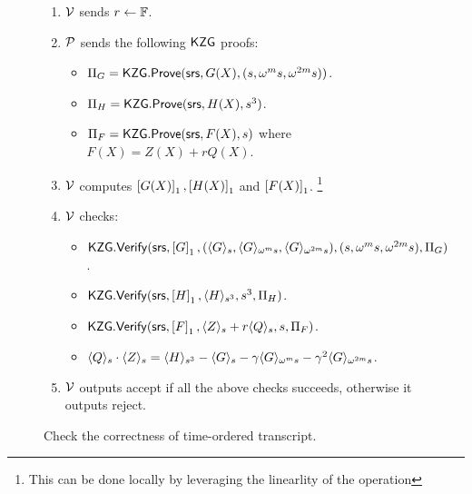\begin{figure}[htbp]
\begin{mdframed}
{\begin{enumerate}[leftmargin=1em, label=\arabic*.]
            $\val{\omega^{2m}s}{G}=G(\omega^{2m} s)$, $\val{s^3}{H}=H(s^3)$, $\val{s}{Q}=Q(s)$ and $\val{s}{Z}=Z(s)$.
            \item $\verifier$ sends $r\gets\F$.
            \item $\prover$ sends the following $\kzg$ proofs:
            \begin{itemize}[leftmargin=1em]
                \item $\Pi_G=\kzgprove(\srs,G(X),(s,\omega^m s, \omega^{2m}s))$.
                \item $\Pi_H=\kzgprove(\srs,H(X),s^3)$.
                \item $\Pi_F=\kzgprove(\srs,F(X),s)$ where $F(X)=Z(X) + rQ(X)$.
            \end{itemize}
            \item $\verifier$ computes $\gone{G(X)},\gone{H(X)}$ and $\gone{F(X)}$. \footnote{This can be done locally by leveraging the linearlity of the operation}
            \item $\verifier$ checks:
            \begin{itemize}[leftmargin=1em]
                \item $\kzgverify(\srs,\gone{G}, (\val{s}{G}, \val{\omega^m s}{G}, \val{\omega^{2m} s}{G}),(s,\omega^m s, \omega^{2m}s),\Pi_G)$.
                \item $\kzgverify(\srs,\gone{H}, \val{s^3}{H}, s^3, \Pi_H)$.
                \item $\kzgverify(\srs,\gone{F}, \val{s}{Z} + r\val{s}{Q}, s, \Pi_F)$.
                \item $\val{s}{Q}\cdot \val{s}{Z} = \val{s^3}{H}-\val{s}{G}-\gamma \val{\omega^m s}{G}-\gamma^2\val{\omega^{2m}s}{G}$.
            \end{itemize}
            \item $\verifier$ outputs accept if all the above checks succeeds, otherwise it outputs reject.
        \end{enumerate}
    }
    \end{mdframed}
    \caption{Check the correctness of time-ordered transcript.}
    \label{fig:time-ordered-transcript}
\end{figure}

